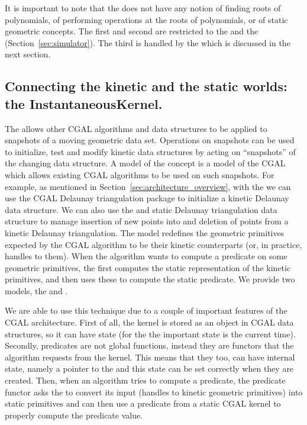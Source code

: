 It is important to note that the  does not have any notion of
finding roots of polynomials, of performing operations at the roots of
polynomials, or of static geometric concepts. The first and second are
restricted to the  and the 
(Section~\ref{sec:simulator}). The third is handled by the  which
is discussed in the next section.

\subsection{Connecting the kinetic and the static worlds: the InstantaneousKernel.}
\label{sec:instantaneous_kernel}

The  allows other CGAL algorithms and data
structures to be applied to snapshots of a moving geometric data
set. Operations on snapshots can be used to initialize, test and
modify kinetic data structures by acting on ``snapshots'' of the
changing data structure. A model of the 
concept is a model of the CGAL  which allows existing CGAL
algorithms to be used on such snapshots.  For example, as mentioned in
Section~\ref{sec:architecture_overview}, with the
 we can use the CGAL Delaunay triangulation
package to initialize a kinetic Delaunay data structure. We can also
use the  and static Delaunay triangulation
data structure to manage insertion of new points into and deletion of
points from a kinetic Delaunay triangulation. The
 model redefines the geometric primitives
expected by the CGAL algorithm to be their kinetic counterparts (or,
in practice, handles to them). When the algorithm wants to compute a
predicate on some geometric primitives, the 
first computes the static representation of the kinetic primitives,
and then uses these to compute the static predicate. We provide two
models, the
 and
.

We are able to use this technique due to a couple of important
features of the CGAL architecture. First of all, the kernel is stored
as an object in CGAL data structures, so it can have state (for the
 the important state is the current
time). Secondly, predicates are not global functions, instead they are
functors that the algorithm requests from the kernel. This means that
they too, can have internal state, namely a pointer to the
 and this state can be set correctly when
they are created. Then, when an algorithm tries to compute a
predicate, the predicate functor asks the  to
convert its input (handles to kinetic geometric primitives) into
static primitives and can then use a predicate from a static CGAL
kernel to properly compute the predicate value.

